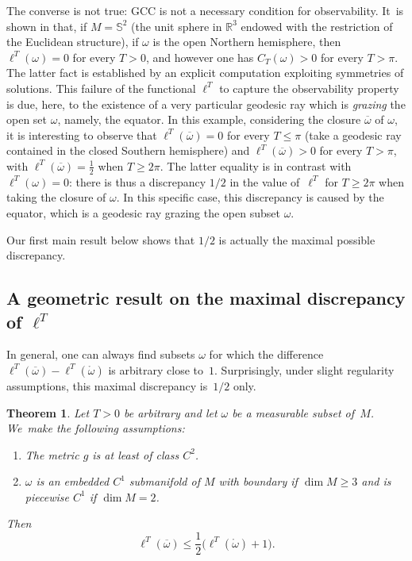 \documentclass[10pt]{amsart}
\newenvironment{enumeratei}
{\bgroup\def\theenumi{\roman{enumi}}\def\theenumii{\arabic{enumii}}\begin{enumerate}}
{\end{enumerate}\egroup}
\def\R{\mathbb{R}}
\newtheorem{theorem}{Theorem}
\theoremstyle{definition}
\begin{document}
The converse is not true: GCC is not a necessary condition for observability.
It~is shown in \cite{Lebeau_JEDP1992} that, if $M=\mathbb{S}^2$ (the unit sphere in $\R^3$ endowed with the restriction of the Euclidean structure), if $\omega$ is the open Northern hemisphere, then $\ell^T(\omega)=0$ for every $T>0$, and however one has $C_T(\omega)>0$ for every $T>\pi$. The latter fact is established by an explicit computation exploiting symmetries of solutions.
This failure of the functional $\ell^T$ to capture the observability property is due, here, to the existence of a very particular geodesic ray which is \emph{grazing} the open set $\omega$, namely, the equator.
In this example, considering the closure $\overline\omega$ of $\omega$, it is interesting to observe that $\ell^T(\overline\omega)=0$ for every $T\leq\pi$ (take a geodesic ray contained in the closed Southern hemisphere) and $\ell^T(\overline\omega)>0$ for every $T>\pi$, with $\ell^T(\overline\omega)=\frac{1}{2}$ when $T\geq 2\pi$. The latter equality is in contrast with $\ell^T(\omega)=0$: there is thus a discrepancy $1/2$ in the value of~$\ell^T$ for $T\geq 2\pi$ when taking the closure of $\omega$. In this specific case, this discrepancy is caused by the equator, which is a geodesic ray grazing the open subset $\omega$.

Our first main result below shows that $1/2$ is actually the maximal possible discrepancy.

\subsection{A geometric result on the maximal discrepancy of $\ell^T$}
In general, one can always find subsets $\omega$ for which the difference $\ell^T(\overline\omega)- \ell^T(\mathring{\omega})$ is arbitrary close to~$1$. Surprisingly, under slight regularity assumptions, this maximal discrepancy is~$1/2$ only.

\begin{theorem} \label{thm_geom}
Let $T>0$ be arbitrary and let $\omega$ be a measurable subset of~$M$.
We~make the following assumptions:
\begin{enumeratei}
\item\label{thm_geomi}
The metric $g$ is at least of class $C^2$.
\item\label{thm_geomii}
$\omega$ is an embedded $C^1$ submanifold of $M$ with boundary if $\dim M \geq 3$ and is piecewise $C^1$ if $\dim M=2$.
\end{enumeratei}
Then
\begin{equation}\label{mainineq}
\ell^T(\overline\omega) \leq \frac{1}{2}\bigl( \ell^T(\mathring{\omega}) + 1\bigr).
\end{equation}
\end{theorem}
\end{document}
